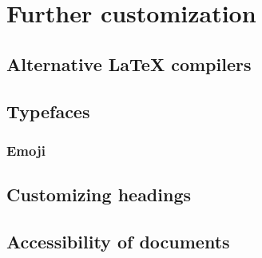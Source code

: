 \chapter{Further customization}

\section{Alternative \LaTeX{} compilers}

\section{Typefaces}\label{sec:typefaces}



\subsection{Emoji}\label{sec:emoji}

\section{Customizing headings}

\section{Accessibility of documents}
